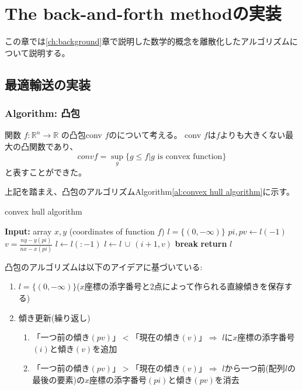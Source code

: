 \chapter{The back-and-forth methodの実装} 
\label{ch:al_baf}
この章では\ref{ch:background}章で説明した数学的概念を離散化したアルゴリズムについて説明する。
\section{最適輸送の実装}
\label{sect:algorithm}

\subsection{Algorithm: 凸包}
\label{sect:al_convex_hull}
関数 \( f : \mathbb{R}^n \to \mathbb{R} \) の凸包conv $f$のについて考える。
conv $f$は$f$よりも大きくない最大の凸関数であり、
\[
    conv f = \sup_g \{ g \le f | g \text{ is convex function}\}
\]
と表すことができた。

上記を踏まえ、凸包のアルゴリズムAlgorithm\ref{al:convex hull algorithm}に示す。



\begin{algorithm}[tb]
    \caption{convex hull algorithm}
    \label{al:convex hull algorithm}
    \begin{algorithmic}[1]
        \State \textbf{Input:} array $x, y$ (coordinates of function $f$)
        \State $l = \{(0, -\infty)\}$ 
                \State $pi, pv \gets l(-1)$
                \State $v = \frac{ny - y(pi)} {nx - x(pi)} $
                    \State $l \gets l(:-1)$
                \Else
                    \State $l \gets l \, \cup \, (i+1, v)$
                    \State \textbf{break}
                \EndIf
            \EndWhile
        \EndFor
        \State \textbf{return} $l$
    \end{algorithmic}
\end{algorithm}

凸包のアルゴリズムは以下のアイデアに基づいている:
\begin{enumerate}
    \item $l = \{(0, - \infty)\}$($x$座標の添字番号と2点によって作られる直線傾きを保存する) 
    \item 傾き更新(繰り返し)
    \begin{enumerate}
        \item 「一つ前の傾き$(pv)$」$ < $「現在の傾き$(v)$」$\Rightarrow$ $l$に$x$座標の添字番号$(i)$と傾き$(v)$を追加
        \item 「一つ前の傾き$(pv)$」$ > $「現在の傾き$(v)$」$\Rightarrow$ $l$から一つ前(配列$l$の最後の要素)の$x$座標の添字番号$(pi)$と傾き$(pv)$を消去
    \end{enumerate}
\end{enumerate}

